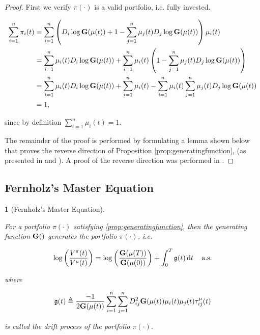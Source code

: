 \documentclass[british]{amsart} \usepackage{lmodern}
\numberwithin{equation}{section} \numberwithin{figure}{section}
\theoremstyle{plain} \newtheorem{thm}{\protect\theoremname}[section]
\theoremstyle{definition} \newtheorem{defn}[thm]{\protect\definitionname}
\theoremstyle{plain} \newtheorem{assumption}[thm]{\protect\assumptionname}
\theoremstyle{plain} \newtheorem{lem}[thm]{\protect\lemmaname}
\theoremstyle{plain} \newtheorem{prop}[thm]{\protect\propositionname}
\theoremstyle{remark} \newtheorem{rem}[thm]{\protect\remarkname}
\theoremstyle{plain} \newtheorem{cor}[thm]{\protect\corollaryname}
\renewcommand{\d}[1]{\mathop{\mathrm{d}{#1}}}
\begin{document}
\begin{proof}
  First we verify $\pi(\cdot)$ is a valid portfolio, i.e. fully invested.

   \begin{gather}
    \begin{split}
      \sum_{i=1}^{n} \pi_{i}(t) 
      &= \sum_{i=1}^{n} 
        \left( 
          D_{i}\log{\mathbf{G}(\mu(t))} + 1 - 
            \sum_{j=1}^{n} \mu_{j}(t)D_{j}\log{\mathbf{G}(\mu(t))}
        \right) \mu_{i}(t) \\
      &= 
        \sum_{i=1}^{n} \mu_{i}(t) D_{i}\log{\mathbf{G}(\mu(t))} + 
        \sum_{i=1}^{n} \mu_{i}(t)
        \left( 
          1 - \sum_{j=1}^{n} \mu_{j}(t)D_{j}\log{\mathbf{G}(\mu(t))}
        \right) \\
       &= 
        \sum_{i=1}^{n} \mu_{i}(t) D_{i}\log{\mathbf{G}(\mu(t))} + 
        \sum_{i=1}^{n} \mu_{i}(t) -
        \sum_{i=1}^{n} \mu_{i}(t) \sum_{j=1}^{n} \mu_{j}(t)D_{j}\log{\mathbf{G}(\mu(t))} \\
       &= 1,
    \end{split}
  \end{gather}

  since by definition $\sum_{i=1}^{n} \mu_{i}(t) = 1$.

  The remainder of the proof is performed by formulating a lemma shown below that
  proves the reverse direction of Proposition \ref{prop:generatingfunction}, (as
  presented in \cite{fernholz2009} and \cite{vervuurt2015}). A proof of the
  reverse direction was performed in \cite{fernholz1999pgf}. 

\end{proof}

\subsection{Fernholz's Master Equation}

\begin{lem} [Fernholz's Master Equation]
  \label{lem:masterequationlemma}

  For a portfolio $\pi(\cdot)$ satisfying \ref{prop:generatingfunction}, then the
  generating function $\mathbf{G}()$ generates the portfolio $\pi(\cdot)$, i.e.

  \begin{equation}
    \label{eq:masterequation}
    \log \left( \frac{V^{\pi}(t)}{V^{\mu}(t)} \right) = 
    \log \left( \frac{\G{\mu(T)}}{\G{\mu(0)}} \right) + 
      \int_{0}^{T} \g \d{t}
    \quad \almostsurely
  \end{equation}

  where 

  \begin{equation}
    \mathfrak{g}(t) \triangleq \frac{-1}{2 \mathbf{G}(\mu(t))}
        \sum_{i=1}^{n} \sum_{j=1}^{n} D_{ij}^{2} \mathbf{G}(\mu(t)) 
        \mu_{i}(t) \mu_{j}(t)
        \tau_{ij}^{\mu}(t)
  \end{equation}

  is called the \textit{drift process} of the portfolio $\pi(\cdot)$.

\end{lem}
\end{document}
